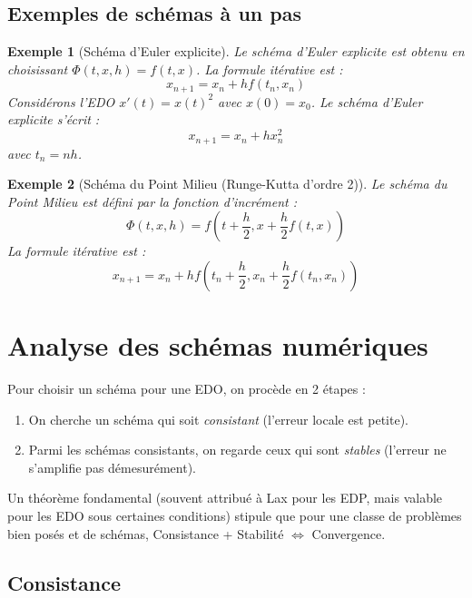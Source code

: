 \documentclass{article}
\newtheorem{example}{Exemple}
\begin{document}
\subsection{Exemples de schémas à un pas}

\begin{example}[Schéma d'Euler explicite]
Le schéma d'Euler explicite est obtenu en choisissant $\Phi(t, x, h) = f(t, x)$. La formule itérative est :
\begin{equation*}
x_{n+1} = x_n + h f(t_n, x_n)
\end{equation*}
Considérons l'EDO $x'(t) = x(t)^2$ avec $x(0) = x_0$. Le schéma d'Euler explicite s'écrit :
\begin{equation*}
x_{n+1} = x_n + h x_n^2
\end{equation*}
avec $t_n = n h$.
\end{example}

\begin{example}[Schéma du Point Milieu (Runge-Kutta d'ordre 2)]
Le schéma du Point Milieu est défini par la fonction d'incrément :
\begin{equation*}
\Phi(t, x, h) = f\left(t + \frac{h}{2}, x + \frac{h}{2} f(t, x)\right)
\end{equation*}
La formule itérative est :
\begin{equation*}
x_{n+1} = x_n + h f\left(t_n + \frac{h}{2}, x_n + \frac{h}{2} f(t_n, x_n)\right)
\end{equation*}
\end{example}

\section{Analyse des schémas numériques}

Pour choisir un schéma pour une EDO, on procède en 2 étapes :
\begin{enumerate}
    \item On cherche un schéma qui soit \textit{consistant} (l'erreur locale est petite).
    \item Parmi les schémas consistants, on regarde ceux qui sont \textit{stables} (l'erreur ne s'amplifie pas démesurément).
\end{enumerate}
Un théorème fondamental (souvent attribué à Lax pour les EDP, mais valable pour les EDO sous certaines conditions) stipule que pour une classe de problèmes bien posés et de schémas, Consistance + Stabilité $\iff$ Convergence.

\subsection{Consistance}
\end{document}

